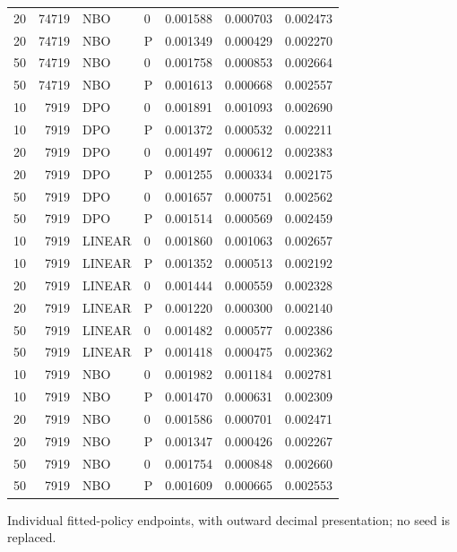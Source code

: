 \begin{longtable}{rrllrrr}
20 & 74719 & NBO & 0 & 0.001588 & 0.000703 & 0.002473\\
20 & 74719 & NBO & P & 0.001349 & 0.000429 & 0.002270\\
50 & 74719 & NBO & 0 & 0.001758 & 0.000853 & 0.002664\\
50 & 74719 & NBO & P & 0.001613 & 0.000668 & 0.002557\\
10 & 7919 & DPO & 0 & 0.001891 & 0.001093 & 0.002690\\
10 & 7919 & DPO & P & 0.001372 & 0.000532 & 0.002211\\
20 & 7919 & DPO & 0 & 0.001497 & 0.000612 & 0.002383\\
20 & 7919 & DPO & P & 0.001255 & 0.000334 & 0.002175\\
50 & 7919 & DPO & 0 & 0.001657 & 0.000751 & 0.002562\\
50 & 7919 & DPO & P & 0.001514 & 0.000569 & 0.002459\\
10 & 7919 & LINEAR & 0 & 0.001860 & 0.001063 & 0.002657\\
10 & 7919 & LINEAR & P & 0.001352 & 0.000513 & 0.002192\\
20 & 7919 & LINEAR & 0 & 0.001444 & 0.000559 & 0.002328\\
20 & 7919 & LINEAR & P & 0.001220 & 0.000300 & 0.002140\\
50 & 7919 & LINEAR & 0 & 0.001482 & 0.000577 & 0.002386\\
50 & 7919 & LINEAR & P & 0.001418 & 0.000475 & 0.002362\\
10 & 7919 & NBO & 0 & 0.001982 & 0.001184 & 0.002781\\
10 & 7919 & NBO & P & 0.001470 & 0.000631 & 0.002309\\
20 & 7919 & NBO & 0 & 0.001586 & 0.000701 & 0.002471\\
20 & 7919 & NBO & P & 0.001347 & 0.000426 & 0.002267\\
50 & 7919 & NBO & 0 & 0.001754 & 0.000848 & 0.002660\\
50 & 7919 & NBO & P & 0.001609 & 0.000665 & 0.002553\\
\bottomrule\end{longtable}
\noindent Individual fitted-policy endpoints, with outward decimal presentation; no seed is replaced.
\endgroup
